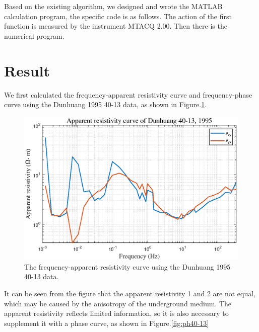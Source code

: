 \documentclass[9pt,a4paper,twoside]{rho-class/rho}
\begin{document}
Based on the existing algorithm, we designed and wrote the MATLAB calculation program, the specific code is as follows. The action of the first function is measured by the instrument MTACQ 2.00. Then there is the numerical program.

\nolinenumbers

\linenumbers

\section{Result}

We first calculated the frequency-apparent resistivity curve and frequency-phase curve using the Dunhuang 1995 40-13 data, as shown in Figure.\ref{fig:r40-13}.

\begin{figure}[htbp]
    \centering
    \includegraphics[width=0.95\columnwidth]{figures/r40-13.eps}
    \caption{The frequency-apparent resistivity curve  using the Dunhuang 1995 40-13 data.}
    \label{fig:r40-13}
\end{figure}

It can be seen from the figure that the apparent resistivity 1 and 2 are not equal, which may be caused by the anisotropy of the underground medium. The apparent resistivity reflects limited information, so it is also necessary to supplement it with a phase curve, as shown in Figure.\ref{fig:ph40-13}
\end{document}
